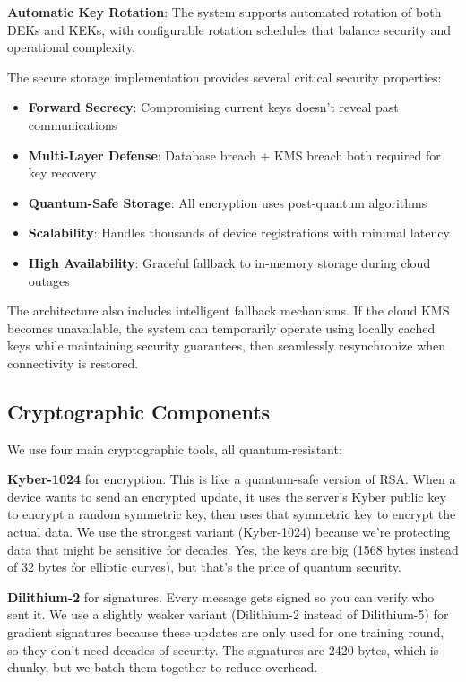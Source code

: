 \documentclass[onecolumn,11pt]{article}
\begin{document}
\textbf{Automatic Key Rotation}: The system supports automated rotation of both DEKs and KEKs, with configurable rotation schedules that balance security and operational complexity.

The secure storage implementation provides several critical security properties:

\begin{itemize}
\item \textbf{Forward Secrecy}: Compromising current keys doesn't reveal past communications
\item \textbf{Multi-Layer Defense}: Database breach + KMS breach both required for key recovery
\item \textbf{Quantum-Safe Storage}: All encryption uses post-quantum algorithms
\item \textbf{Scalability}: Handles thousands of device registrations with minimal latency
\item \textbf{High Availability}: Graceful fallback to in-memory storage during cloud outages
\end{itemize}

The architecture also includes intelligent fallback mechanisms. If the cloud KMS becomes unavailable, the system can temporarily operate using locally cached keys while maintaining security guarantees, then seamlessly resynchronize when connectivity is restored.

\subsection{Cryptographic Components}

We use four main cryptographic tools, all quantum-resistant:

\textbf{Kyber-1024} for encryption. This is like a quantum-safe version of RSA. When a device wants to send an encrypted update, it uses the server's Kyber public key to encrypt a random symmetric key, then uses that symmetric key to encrypt the actual data. We use the strongest variant (Kyber-1024) because we're protecting data that might be sensitive for decades. Yes, the keys are big (1568 bytes instead of 32 bytes for elliptic curves), but that's the price of quantum security.

\textbf{Dilithium-2} for signatures. Every message gets signed so you can verify who sent it. We use a slightly weaker variant (Dilithium-2 instead of Dilithium-5) for gradient signatures because these updates are only used for one training round, so they don't need decades of security. The signatures are 2420 bytes, which is chunky, but we batch them together to reduce overhead.
\end{document}

